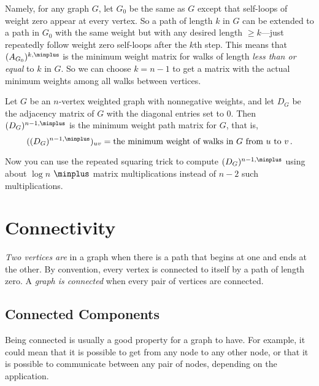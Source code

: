 \begin{editingnotes}
Namely, for any graph $G$, let $G_0$ be the same as $G$ except that
self-loops of weight zero appear at every vertex.  So a path of length $k$
in $G$ can be extended to a path in $G_0$ with the same weight but with
any desired length $ \geq k$---just repeatedly follow weight zero
self-loops after the $k$th step.  This means that $(A_{G_0})^{k, \minplus}$
is the minimum weight matrix for walks of length \emph{less than or equal}
to $k$ in $G$.  So we can choose $k = n-1$ to get a matrix with the
actual minimum weights among all walks between vertices.

\begin{theorem}\label{thm:minweightmatrix}
Let $G$ be an $n$-vertex weighted graph with nonnegative weights, and let
$D_G$ be the adjacency matrix of $G$ with the diagonal entries set to 0.
Then $(D_G)^{n-1, \minplus}$ is the minimum weight path matrix for $G$, that
is,
\[
((D_G)^{n-1, \minplus})_{uv} = \text{the minimum weight of walks in $G$ from
 $u$ to $v$}\,.
\]
\end{theorem}
Now you can use the repeated squaring trick to compute $(D_G)^{n-1,
  \minplus}$ using about $\log n$ $\minplus$ matrix multiplications
instead of $n-2$ such multiplications.


\end{editingnotes}
\fi

\section{Connectivity}

\begin{definition}\label{def:connected-vertices} %
  \emph{Two vertices are}  in a graph when there is a
  path that begins at one and ends at the other.  By convention, every
  vertex is connected to itself by a path of length zero.  A
  \emph{graph is connected} when every pair of vertices are connected.
\end{definition}

\subsection{Connected Components}

Being connected is usually a good property for a graph to have.  For
example, it could mean that it is possible to get from any node to any
other node, or that it is possible to communicate between any pair of
nodes, depending on the application.

